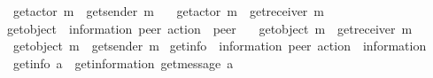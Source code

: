 \begin{isabellebody}
\ \ {\isachardoublequoteopen}get{\isacharunderscore}{\kern0pt}actor\ {\isacharparenleft}{\kern0pt}{\isacharbang}{\kern0pt}{\isasymlangle}m{\isasymrangle}{\isacharparenright}{\kern0pt}\ {\isacharequal}{\kern0pt}\ get{\isacharunderscore}{\kern0pt}sender\ m{\isachardoublequoteclose}\ {\isacharbar}{\kern0pt}\isanewline
\ \ {\isachardoublequoteopen}get{\isacharunderscore}{\kern0pt}actor\ {\isacharparenleft}{\kern0pt}{\isacharquery}{\kern0pt}{\isasymlangle}m{\isasymrangle}{\isacharparenright}{\kern0pt}\ {\isacharequal}{\kern0pt}\ get{\isacharunderscore}{\kern0pt}receiver\ m{\isachardoublequoteclose}\isanewline
\isanewline
{}\isamarkupfalse%
\ get{\isacharunderscore}{\kern0pt}object\ {\isacharcolon}{\kern0pt}{\isacharcolon}{\kern0pt}\ {\isachardoublequoteopen}{\isacharparenleft}{\kern0pt}{\isacharprime}{\kern0pt}information{\isacharcomma}{\kern0pt}\ {\isacharprime}{\kern0pt}peer{\isacharparenright}{\kern0pt}\ action\ {\isasymRightarrow}\ {\isacharprime}{\kern0pt}peer{\isachardoublequoteclose}\ \isanewline
\ \ {\isachardoublequoteopen}get{\isacharunderscore}{\kern0pt}object\ {\isacharparenleft}{\kern0pt}{\isacharbang}{\kern0pt}{\isasymlangle}m{\isasymrangle}{\isacharparenright}{\kern0pt}\ {\isacharequal}{\kern0pt}\ get{\isacharunderscore}{\kern0pt}receiver\ m{\isachardoublequoteclose}\ {\isacharbar}{\kern0pt}\isanewline
\ \ {\isachardoublequoteopen}get{\isacharunderscore}{\kern0pt}object\ {\isacharparenleft}{\kern0pt}{\isacharquery}{\kern0pt}{\isasymlangle}m{\isasymrangle}{\isacharparenright}{\kern0pt}\ {\isacharequal}{\kern0pt}\ get{\isacharunderscore}{\kern0pt}sender\ m{\isachardoublequoteclose}\isanewline
\isanewline
{}\isamarkupfalse%
\ get{\isacharunderscore}{\kern0pt}info\ {\isacharcolon}{\kern0pt}{\isacharcolon}{\kern0pt}\ {\isachardoublequoteopen}{\isacharparenleft}{\kern0pt}{\isacharprime}{\kern0pt}information{\isacharcomma}{\kern0pt}\ {\isacharprime}{\kern0pt}peer{\isacharparenright}{\kern0pt}\ action\ {\isasymRightarrow}\ {\isacharprime}{\kern0pt}information{\isachardoublequoteclose}\ \isanewline
\ \ {\isachardoublequoteopen}get{\isacharunderscore}{\kern0pt}info\ a\ {\isasymequiv}\ get{\isacharunderscore}{\kern0pt}information\ {\isacharparenleft}{\kern0pt}get{\isacharunderscore}{\kern0pt}message\ a{\isacharparenright}{\kern0pt}{\isachardoublequoteclose}%
\isadelimdocument
%
\endisadelimdocument
%
\isatagdocument
%
\isamarkuptrue%
%
\endisatagdocument
{\isafolddocument}%
%
\isadelimdocument
%
\endisadelimdocument
{}\isamarkupfalse%

\end{isabellebody}
